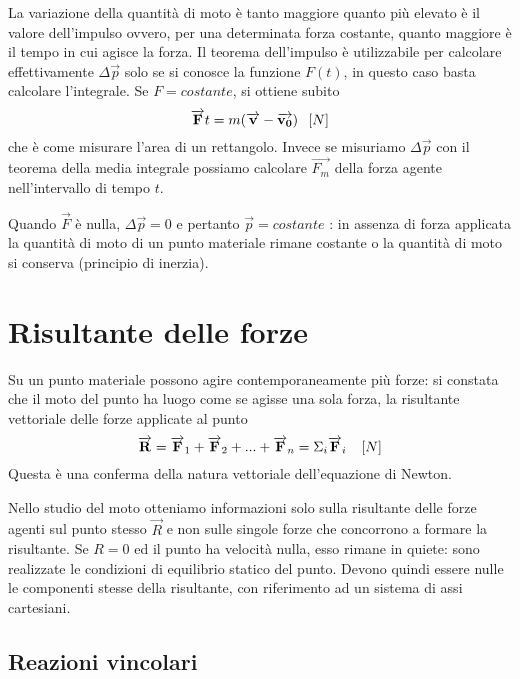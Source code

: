 \documentclass[class=book, crop=false, oneside, 12pt]{standalone}
\begin{document}
La variazione della quantità di moto è tanto maggiore quanto più elevato è il valore dell'impulso ovvero, per una determinata forza costante, quanto maggiore è il tempo in cui agisce la forza.
Il teorema dell'impulso è utilizzabile per calcolare effettivamente \(\Delta \overrightarrow{p}\) solo se si conosce la funzione \(F (t)\), in questo caso basta calcolare l'integrale.
Se \(F = costante\), si ottiene subito
\begin{equation*}
    \overrightarrow{F} t = m (\overrightarrow{v} - \overrightarrow{v_0}) \udm{N}
\end{equation*}
che è come misurare l'area di un rettangolo.
Invece se misuriamo \(\Delta \overrightarrow{p}\) con il teorema della media integrale possiamo calcolare \(\overrightarrow{F_m}\) della forza agente nell'intervallo di tempo \(t\).

Quando \(\overrightarrow{F}\) è nulla, \(\Delta \overrightarrow{p} = 0\) e pertanto \(\overrightarrow{p} = costante\) : in assenza di forza applicata la quantità di moto di un punto materiale rimane costante o la quantità di moto si conserva (principio di inerzia).

\section{Risultante delle forze}
Su un punto materiale possono agire contemporaneamente più forze: si constata che il moto del punto ha luogo come se agisse una sola forza, la risultante vettoriale delle forze applicate al punto
\begin{equation*}
    \overrightarrow{R} = \overrightarrow{F}_1+\overrightarrow{F}_2+ ... + \overrightarrow{F}_n = \Sigma_i \overrightarrow{F}_i \ \udm{N}
\end{equation*}
Questa \`e una conferma della natura vettoriale dell'equazione di Newton.

Nello studio del moto otteniamo informazioni solo sulla risultante delle forze agenti sul punto stesso \(\overrightarrow{R}\) e non sulle singole forze che concorrono a formare la risultante.
Se \(R = 0\) ed il punto ha velocità nulla, esso rimane in quiete: sono realizzate le condizioni di equilibrio statico del punto.
Devono quindi essere nulle le componenti stesse della risultante, con riferimento ad un sistema di assi cartesiani.

\subsection{Reazioni vincolari}
\end{document}
